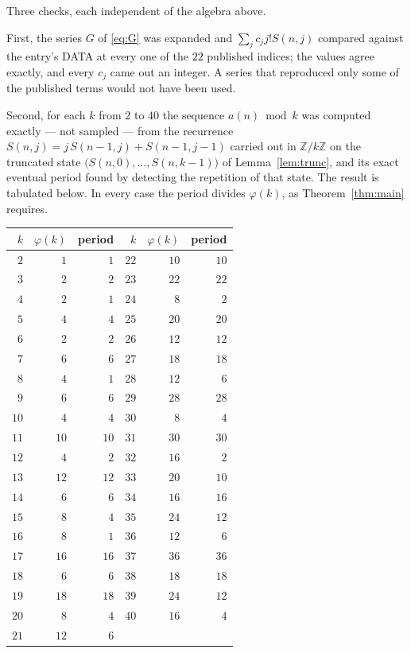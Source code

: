 \documentclass[11pt,a4paper]{article}
\theoremstyle{plain}
\theoremstyle{definition}
\begin{document}
Three checks, each independent of the algebra above.

First, the series $G$ of \eqref{eq:G} was expanded and $\sum_j c_j j! S(n,j)$ compared
against the entry's DATA at every one of the $22$ published indices; the values
agree exactly, and every $c_j$ came out an integer. A series that reproduced only some of
the published terms would not have been used.

Second, for each $k$ from $2$ to $40$ the sequence $a(n)\bmod k$ was computed exactly
--- not sampled --- from the recurrence $S(n,j)=j\,S(n-1,j)+S(n-1,j-1)$ carried out in
$\mathbb{Z}/k\mathbb{Z}$ on the truncated state
$\bigl(S(n,0),\dots,S(n,k-1)\bigr)$ of Lemma~\ref{lem:trunc}, and its exact eventual
period found by detecting the repetition of that state. The result is tabulated below.
In every case the period divides $\varphi(k)$, as Theorem~\ref{thm:main} requires.

\begin{center}\small
\begin{tabular}{rrr@{\qquad\qquad}rrr}
$k$ & $\varphi(k)$ & period & $k$ & $\varphi(k)$ & period \\ \hline
$2$ & $1$ & $1$ & $22$ & $10$ & $10$ \\
$3$ & $2$ & $2$ & $23$ & $22$ & $22$ \\
$4$ & $2$ & $1$ & $24$ & $8$ & $2$ \\
$5$ & $4$ & $4$ & $25$ & $20$ & $20$ \\
$6$ & $2$ & $2$ & $26$ & $12$ & $12$ \\
$7$ & $6$ & $6$ & $27$ & $18$ & $18$ \\
$8$ & $4$ & $1$ & $28$ & $12$ & $6$ \\
$9$ & $6$ & $6$ & $29$ & $28$ & $28$ \\
$10$ & $4$ & $4$ & $30$ & $8$ & $4$ \\
$11$ & $10$ & $10$ & $31$ & $30$ & $30$ \\
$12$ & $4$ & $2$ & $32$ & $16$ & $2$ \\
$13$ & $12$ & $12$ & $33$ & $20$ & $10$ \\
$14$ & $6$ & $6$ & $34$ & $16$ & $16$ \\
$15$ & $8$ & $4$ & $35$ & $24$ & $12$ \\
$16$ & $8$ & $1$ & $36$ & $12$ & $6$ \\
$17$ & $16$ & $16$ & $37$ & $36$ & $36$ \\
$18$ & $6$ & $6$ & $38$ & $18$ & $18$ \\
$19$ & $18$ & $18$ & $39$ & $24$ & $12$ \\
$20$ & $8$ & $4$ & $40$ & $16$ & $4$ \\
$21$ & $12$ & $6$ &  & & \\
\end{tabular}
\end{center}
\end{document}
